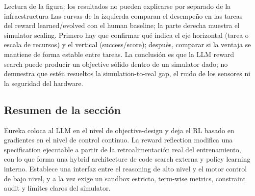 
\begin{knowledgebox}{Lectura de la figura: los resultados no pueden explicarse por separado de la infraestructura}
Las curvas de la izquierda comparan el desempeño en las tareas del reward learned/evolved con el human baseline; la parte derecha muestra el simulator scaling. Primero hay que confirmar qué indica el eje horizontal (tarea o escala de recursos) y el vertical (success/score); después, comparar si la ventaja se mantiene de forma estable entre tareas. La conclusión es que la LLM reward search puede producir un objective sólido dentro de un simulator dado; no demuestra que estén resueltos la simulation-to-real gap, el ruido de los sensores ni la seguridad del hardware.
\end{knowledgebox}


\subsection{Resumen de la sección}

Eureka coloca al LLM en el nivel de objective-design y deja el RL basado en gradientes en el nivel de control continuo. La reward reflection modifica una specification ejecutable a partir de la retroalimentación real del entrenamiento, con lo que forma una hybrid architecture de code search externa y policy learning interno. Establece una interfaz entre el reasoning de alto nivel y el motor control de bajo nivel, y a la vez exige un sandbox estricto, term-wise metrics, constraint audit y límites claros del simulator.
